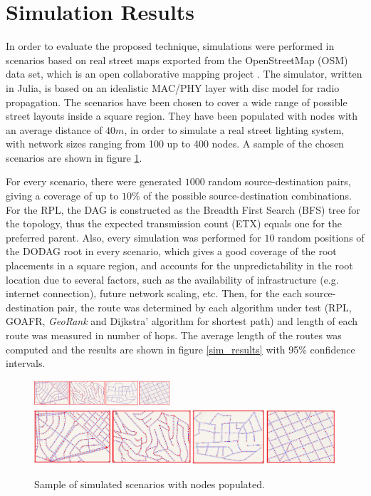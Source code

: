 \documentclass[final,authoryear,3p,twocolumn]{elsarticle}
\begin{document}
\section{Simulation Results}
\label{secSimulation}

In order to evaluate the proposed technique, simulations were performed in scenarios based on real street maps exported from the OpenStreetMap (OSM) data set, which is an open collaborative mapping project \citep{OSM}. The simulator, written in Julia, is based on an idealistic MAC/PHY layer with disc model for radio propagation. The scenarios have been chosen to cover a wide range of possible street layouts inside a square region. They have been populated with nodes with an average distance of $40m$, in order to simulate a real street lighting system, with network sizes ranging from 100 up to 400 nodes. A sample of the chosen scenarios are shown in figure \ref{sim_scenarios}. 

For every scenario, there were generated $1000$ random source-destination pairs, giving a coverage of up to $10$\% of the possible source-destination combinations. For the RPL, the DAG is constructed as the Breadth First Search (BFS) tree for the topology, thus the expected transmission count (ETX) equals one for the preferred parent. Also, every simulation was performed for $10$ random positions of the DODAG root in every scenario, which gives a good coverage of the root placements in a square region, and accounts for the unpredictability in the root location due to several factors, such as the availability of infrastructure (e.g. internet connection),  future network scaling, etc. Then, for the each source-destination pair, the route was determined by each algorithm under test (RPL, GOAFR, \textit{GeoRank} and Dijkstra' algorithm for shortest path) and length of each route was measured in number of hops. The average length of the routes was computed and the results are shown in figure \ref{sim_results} with 95\% confidence intervals. 
  
\begin{figure}
\centering
\ifdefined\TWOCOL
\includegraphics[width=0.45\textwidth]{figures/sample_scenarios.eps}
\else
\includegraphics[width=1\textwidth]{figures/sample_scenarios.eps}
\fi
\caption{Sample of simulated scenarios with nodes populated.}
\label{sim_scenarios}
\end{figure}
\end{document}

